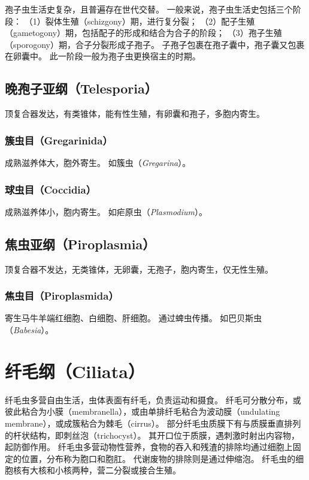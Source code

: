\documentclass[11pt]{article}
\begin{document}
\newline

孢子虫生活史复杂，且普遍存在世代交替。
一般来说，孢子虫生活史包括三个阶段：
（1）裂体生殖（schizgony）期，进行复分裂；
（2）配子生殖（gametogony）期，包括配子的形成和结合为合子的阶段；
（3）孢子生殖（sporogony）期，合子分裂形成子孢子。
子孢子包裹在孢子囊中，孢子囊又包裹在卵囊中。
此一阶段一般为孢子虫更换宿主的时期。

\subsection{晚孢子亚纲（Telesporia）}
顶复合器发达，有类锥体，能有性生殖，有卵囊和孢子，多胞内寄生。

\subsubsection{簇虫目（Gregarinida）}
成熟滋养体大，胞外寄生。
如簇虫（\textit{Gregarina}）。

\subsubsection{球虫目（Coccidia）}
成熟滋养体小，胞内寄生。
如疟原虫（\textit{Plasmodium}）。

\subsection{焦虫亚纲（Piroplasmia）}
顶复合器不发达，无类锥体，无卵囊，无孢子，胞内寄生，仅无性生殖。

\subsubsection{焦虫目（Piroplasmida）}
寄生马牛羊端红细胞、白细胞、肝细胞。
通过蜱虫传播。
如巴贝斯虫（\textit{Babesia}）。

\section{纤毛纲（Ciliata）}
纤毛虫多营自由生活，虫体表面有纤毛，负责运动和摄食。
纤毛可分散分布，或彼此粘合为小膜（membranella），或由单排纤毛粘合为波动膜（undulating membrane），或成簇粘合为棘毛（cirrus）。
部分纤毛虫质膜下有与质膜垂直排列的杆状结构，即刺丝泡（trichocyst）。
其开口位于质膜，遇刺激时射出内容物，起防御作用。
纤毛虫多营动物性营养，食物的吞入和残渣的排除均通过细胞上固定的位置，分布称为胞口和胞肛。
代谢废物的排除则是通过伸缩泡。
纤毛虫的细胞核有大核和小核两种，营二分裂或接合生殖。
\end{document}
